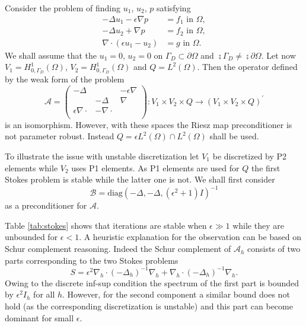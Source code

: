 \begin{example}\label{ex:stokes}
  Consider the problem of finding $u_1$, $u_2$, $p$ satisfying
  \[
  \begin{aligned}
  -\Delta u_1 -\epsilon\nabla p &= f_1\mbox{ in }\Omega,\\
  -\Delta u_2 + \nabla p &= f_2\mbox{ in }\Omega,\\
  \nabla\cdot(\epsilon u_1 - u_2) &= g\mbox{ in }\Omega.
  \end{aligned}
  \]
  We shall assume that the $u_1=0$, $u_2=0$ on $\Gamma_D\subset\partial\Omega$
  and $\semi{\Gamma_D}\neq\semi{\partial\Omega}$. Let now $V_1=H^{1}_{0, \Gamma_D}(\Omega)$,
  $V_2=H^{1}_{0, \Gamma_D}(\Omega)$ and $Q=L^2(\Omega)$. Then the operator defined 
  by the weak form of the problem
  \[
  \mathcal{A}=\begin{pmatrix}
  -\Delta & & -\epsilon\nabla\\
  & -\Delta & \nabla\\
  \epsilon\nabla\cdot & -\nabla\cdot & \\
  \end{pmatrix}: V_1\times V_2\times Q \rightarrow (V_1\times V_2\times Q)^{\prime}
  \]
  is an isomorphism. However, with these spaces the Riesz map preconditioner
  is not parameter robust. Instead $Q=\epsilon L^2(\Omega)\cap L^2{(\Omega)}$
  shall be used.

  To illustrate the issue with unstable discretization
  let $V_1$ be discretized by P2 elements while $V_2$ uses P1 elements. As
  P1 elements are used for $Q$ the first Stokes problem is stable while the
  latter one is not. We shall first consider
  \[
  \mathcal{B}=\text{diag}(-\Delta, -\Delta, (\epsilon^2+1)I)^{-1}
  \]
  as a preconditioner for $\mathcal{A}$.

  Table \ref{tab:stokes} shows that
  iterations are stable when $\epsilon\gg 1$ while they are unbounded for
  $\epsilon<1$. A heuristic explanation for
  the observation can be based on Schur complement reasoning. Indeed the
  Schur complement of $\mathcal{A}_h$ consists of two parts corresponding
  to the two Stokes problems
  \[
  S = \epsilon^2\nabla_h\cdot(-\Delta_h)^{-1}\nabla_h + \nabla_h\cdot(-\Delta_h)^{-1}\nabla_h.
  \]
  Owing to the discrete inf-sup condition the spectrum of the first part is
  bounded by $\epsilon^2 I_h$ for all $h$. However, for the second component
  a similar bound does not hold (as the corresponding discretization is unstable)
  and this part can become dominant for small $\epsilon$.


\end{example}
